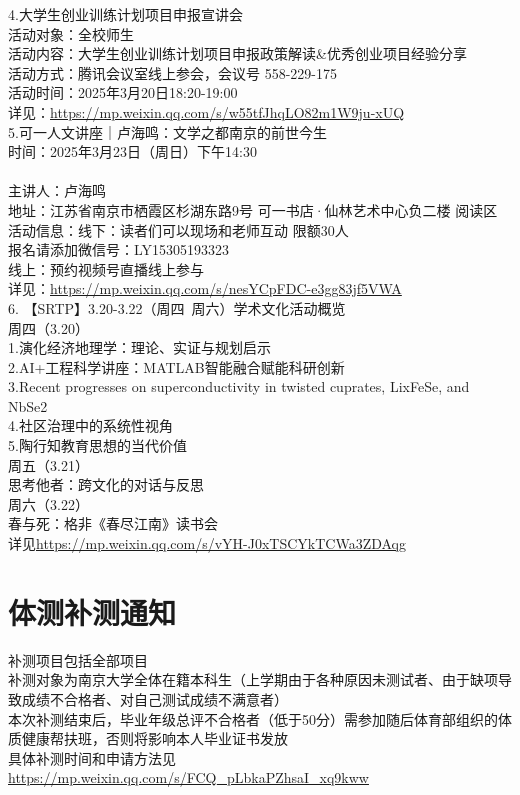 \documentclass[letterpaper, 12pt]{article}
\begin{document}
\begin{multicols}{2}
4.大学生创业训练计划项目申报宣讲会\\
活动对象：全校师生
\\活动内容：大学生创业训练计划项目申报政策解读\&优秀创业项目经验分享
\\活动方式：腾讯会议室线上参会，会议号 558-229-175
\\活动时间：2025年3月20日18:20-19:00
\\详见：\url{https://mp.weixin.qq.com/s/w55tfJhqLO82m1W9ju-xUQ}\\

5.可一人文讲座｜卢海鸣：文学之都南京的前世今生\\
时间：2025年3月23日（周日）下午14:30 \\
\\主讲人：卢海鸣
\\地址：江苏省南京市栖霞区杉湖东路9号 可一书店·仙林艺术中心负二楼 阅读区
\\活动信息：线下：读者们可以现场和老师互动 限额30人
\\报名请添加微信号：LY15305193323
\\线上：预约视频号直播线上参与
\\详见：\url{https://mp.weixin.qq.com/s/nesYCpFDC-e3gg83jf5VWA}\\

6. 【SRTP】3.20-3.22（周四~周六）学术文化活动概览\\
周四（3.20）\\
1.演化经济地理学：理论、实证与规划启示\\
2.AI+工程科学讲座：MATLAB智能融合赋能科研创新\\
3.Recent progresses on superconductivity in twisted cuprates, LixFeSe, and NbSe2\\
4.社区治理中的系统性视角\\
5.陶行知教育思想的当代价值\\
周五（3.21）\\
思考他者：跨文化的对话与反思\\
周六（3.22）\\
春与死：格非《春尽江南》读书会\\
详见\url{https://mp.weixin.qq.com/s/vYH-J0xTSCYkTCWa3ZDAqg}
\section{体测补测通知}
补测项目包括全部项目\\
补测对象为南京大学全体在籍本科生（上学期由于各种原因未测试者、由于缺项导致成绩不合格者、对自己测试成绩不满意者）\\
本次补测结束后，毕业年级总评不合格者（低于50分）需参加随后体育部组织的体质健康帮扶班，否则将影响本人毕业证书发放\\
具体补测时间和申请方法见\url{https://mp.weixin.qq.com/s/FCQ_pLbkaPZhsaI_xq9kww}


\end{multicols}
\end{document}
